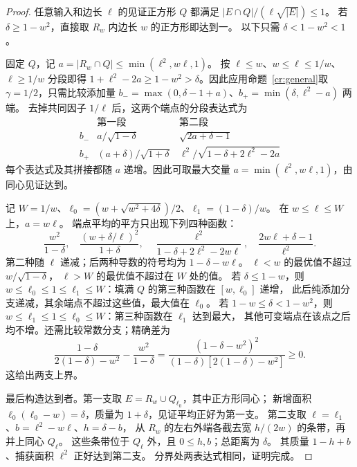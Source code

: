 \begin{proof}
任意输入和边长 $\ell$ 的见证正方形 $Q$ 都满足
$|E\cap Q|/(\ell\sqrt{|E|})\le1$。
若 $\delta\ge1-w^2$，直接取 $R_w$ 内边长 $w$ 的正方形即达到一。
以下只需 $\delta<1-w^2<1$。

固定 $Q$，记 $a=|R_w\cap Q|\le\min(\ell^2,w\ell,1)$。
按 $\ell\le w$、$w\le\ell\le1/w$、$\ell\ge1/w$ 分段即得
$1+\ell^2-2a\ge1-w^2>\delta$。因此应用命题~\ref{cr:general}取 $\gamma=1/2$，只需比较添加量
$b_-=\max(0,\delta-1+a)$、$b_+=\min(\delta,\ell^2-a)$ 两端。
去掉共同因子 $1/\ell$ 后，这两个端点的分段表达式为
\[
 \begin{array}{c|cc}
 &\text{第一段}&\text{第二段}\\\hline
 b_-&a/\sqrt{1-\delta}&\sqrt{2a+\delta-1}\\
 b_+&(a+\delta)/\sqrt{1+\delta}&\ell^2/\sqrt{1-\delta+2\ell^2-2a}
 \end{array}
\]
每个表达式及其拼接都随 $a$ 递增。因此可取最大交量
$a=\min(\ell^2,w\ell,1)$，由同心见证达到。

记 $W=1/w$、$\ell_0=(w+\sqrt{w^2+4\delta})/2$、$\ell_1=(1-\delta)/w$。
在 $w\le\ell\le W$ 上，$a=w\ell$。
端点平均的平方只出现下列四种函数：
\[
 \frac{w^2}{1-\delta},\quad
 \frac{(w+\delta/\ell)^2}{1+\delta},\quad
 \frac{\ell^2}{1-\delta+2\ell^2-2w\ell},\quad
 \frac{2w\ell+\delta-1}{\ell^2}.
\]
第二种随 $\ell$ 递减；后两种导数的符号均为 $1-\delta-w\ell$。
$\ell<w$ 的最优值不超过 $w/\sqrt{1-\delta}$，
$\ell>W$ 的最优值不超过在 $W$ 处的值。
若 $\delta\le1-w$，则
$w\le\ell_0\le1\le\ell_1\le W$：填满 $Q$ 的第三种函数在 $[w,\ell_0]$ 递增，
此后纯添加分支递减，其余端点不超过这些值，最大值在 $\ell_0$。
若 $1-w\le\delta<1-w^2$，则
$w\le\ell_1\le1\le\ell_0\le W$：第三种函数在 $\ell_1$ 达到最大，
其他可变端点在该点之后均不增。还需比较常数分支；精确差为
\[
 \frac{1-\delta}{2(1-\delta)-w^2}-\frac{w^2}{1-\delta}
 =\frac{(1-\delta-w^2)^2}{(1-\delta)[2(1-\delta)-w^2]}\ge0.
\]
这给出两支上界。

最后构造达到者。第一支取 $E=R_w\cup Q_{\ell_0}$，其中正方形同心；
新增面积 $\ell_0(\ell_0-w)=\delta$，质量为 $1+\delta$，见证平均正好为第一支。
第二支取 $\ell=\ell_1$、$b=\ell^2-w\ell$、$h=\delta-b$，
从 $R_w$ 的左右外端各截去宽 $h/(2w)$ 的条带，再并上同心 $Q_\ell$。
这些条带位于 $Q_\ell$ 外，且 $0\le h,b$；总距离为 $\delta$。
其质量 $1-h+b$、捕获面积 $\ell^2$ 正好达到第二支。
分界处两表达式相同，证明完成。
\end{proof}

